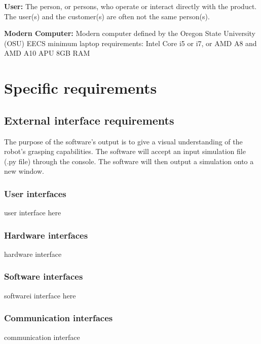\documentclass[10pt,journal,compsoc]{IEEEtran}
\begin{document}
\begin{flushleft}
\vspace{3mm}
\textbf{User:}
The person, or persons, who operate or interact directly with the product. The user(s) and the customer(s) are often not the same person(s).

\vspace{3mm}
\textbf{Modern Computer:}
Modern computer defined by the Oregon State University (OSU) EECS minimum laptop requirements: 
Intel Core i5 or i7, or AMD A8 and AMD A10 APU 8GB RAM


\newpage

\section{Specific requirements}
\vspace{3mm}

\subsection{External interface requirements}
\vspace{3mm}
The purpose of the software's output is to give a visual understanding of the robot's grasping capabilities.
The software will accept an input simulation file (.py file) through the console.
The software will then output a simulation onto a new window.

\subsubsection{User interfaces}
\vspace{3mm}
user interface here

\subsubsection{Hardware interfaces}
\vspace{3mm}
hardware interface

\subsubsection{Software interfaces}
\vspace{3mm}
softwarei interface here

\subsubsection{Communication interfaces}
\vspace{3mm}
communication interface


\end{flushleft}
\end{document}
